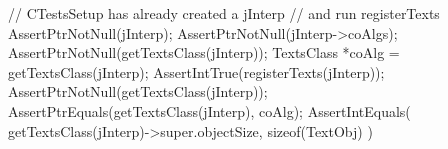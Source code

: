 
\startCTest
  // CTestsSetup has already created a jInterp
  // and run registerTexts
  AssertPtrNotNull(jInterp);
  AssertPtrNotNull(jInterp->coAlgs);
  AssertPtrNotNull(getTextsClass(jInterp));
  TextsClass *coAlg = getTextsClass(jInterp);
  AssertIntTrue(registerTexts(jInterp));
  AssertPtrNotNull(getTextsClass(jInterp));
  AssertPtrEquals(getTextsClass(jInterp), coAlg);
  AssertIntEquals(
    getTextsClass(jInterp)->super.objectSize,
    sizeof(TextObj)
  )
\stopCTest
\stopTestCase
\stopTestSuite
